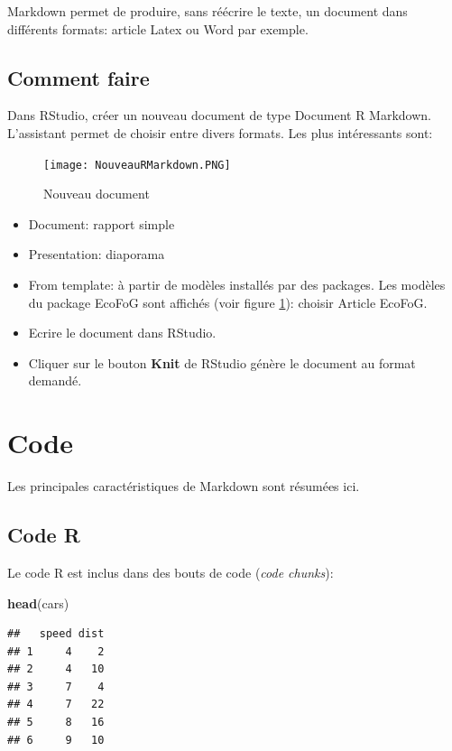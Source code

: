 \documentclass[fleqn,10pt]{ArtEcoFoG} %
\newenvironment{Shaded}{\begin{snugshade}}{\end{snugshade}}
\newcommand{\KeywordTok}[1]{\textcolor[rgb]{0.13,0.29,0.53}{\textbf{{#1}}}}
\newcommand{\NormalTok}[1]{{#1}}
\begin{document}
Markdown permet de produire, sans réécrire le texte, un document dans
différents formats: article Latex ou Word par exemple.

\subsection{Comment faire}\label{comment-faire}

Dans RStudio, créer un nouveau document de type Document R Markdown.
L'assistant permet de choisir entre divers formats. Les plus
intéressants sont:

\begin{figure}
\centering
\texttt{[image: NouveauRMarkdown.PNG]}
\caption{\label{fig:nouveau}Nouveau document}
\end{figure}

\begin{itemize}
\item
  Document: rapport simple
\item
  Presentation: diaporama
\item
  From template: à partir de modèles installés par des packages. Les
  modèles du package EcoFoG sont affichés (voir figure
  \ref{fig:nouveau}): choisir Article EcoFoG.
\item
  Ecrire le document dans RStudio.
\item
  Cliquer sur le bouton \textbf{Knit} de RStudio génère le document au
  format demandé.
\end{itemize}

\section{Code}\label{code}

Les principales caractéristiques de Markdown sont résumées ici.

\subsection{Code R}\label{code-r}

Le code R est inclus dans des bouts de code (\emph{code chunks}):

\begin{Shaded}
\begin{Highlighting}[]
\KeywordTok{head}\NormalTok{(cars)}
\end{Highlighting}
\end{Shaded}

\begin{verbatim}
##   speed dist
## 1     4    2
## 2     4   10
## 3     7    4
## 4     7   22
## 5     8   16
## 6     9   10
\end{verbatim}
\end{document}
